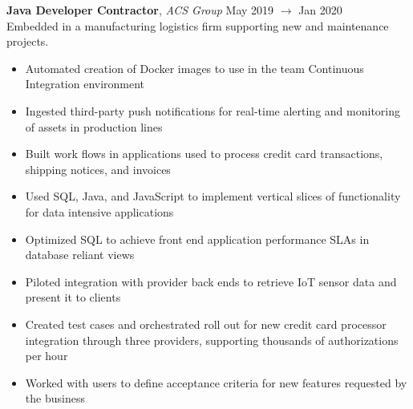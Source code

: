 \documentclass[9pt]{article}
\newenvironment{changemargin}[2]{%
  \begin{list}{}{%
      \setlength{\topsep}{0pt}%
      \setlength{\leftmargin}{#1}%
      \setlength{\rightmargin}{#2}%
      \setlength{\listparindent}{\parindent}%
      \setlength{\itemindent}{\parindent}%
      \setlength{\parsep}{\parskip}%
    }%
  \item[]}{\end{list}
}
\newenvironment{body} {
  \vspace*{-16pt}
  \begin{changemargin}{-0.25in}{-0.5in}
  }	
  {\end{changemargin}
}
\begin{document}
\begin{body}
\begin{itemize}
  \end{itemize}
  \vspace{5pt}
  \textbf{Java Developer \textendash{} Contractor}, \emph{ACS Group} \hfill May 2019 $\to$ Jan 2020 \\
  \vspace*{3pt}
  Embedded in a manufacturing logistics firm supporting new and maintenance projects.
  \begin{itemize} \itemsep=-0pt
  \item Automated creation of Docker images to use in the team Continuous Integration environment
  \item Ingested third-party push notifications for real-time alerting and monitoring of assets in production lines
  \item Built work flows in applications used to process credit card transactions, shipping notices, and invoices
  \item Used SQL, Java, and JavaScript to implement vertical slices of functionality for data intensive applications
  \item Optimized SQL to achieve front end application performance SLAs in database reliant views
  \item Piloted integration with provider back ends to retrieve IoT sensor data and present it to clients
  \item Created test cases and orchestrated roll out for new credit card processor integration through three providers, supporting thousands of authorizations per hour
  \item Worked with users to define acceptance criteria for new features requested by the business
  \end{itemize}
  \vspace{5pt}
  


\end{body}
\end{document}
